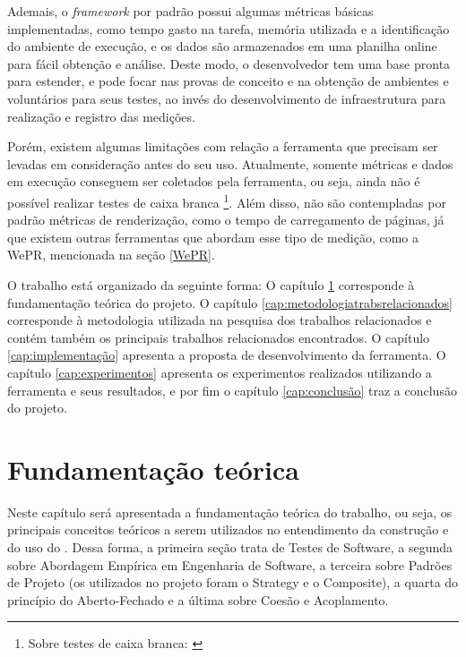 \documentclass[12pt]{tcc}
\begin{document}
	Ademais, o \emph{framework} por padrão possui algumas métricas básicas implementadas, como tempo gasto na tarefa, memória utilizada e a identificação do ambiente de execução, e os dados são armazenados em uma planilha online para fácil obtenção e análise. Deste modo, o desenvolvedor tem uma base pronta para estender, e pode focar nas provas de conceito e na obtenção de ambientes e voluntários para seus testes, ao invés do desenvolvimento de infraestrutura para realização e registro das medições.

	Porém, existem algumas limitações com relação a ferramenta que precisam ser levadas em consideração antes do seu uso. Atualmente, somente métricas e dados em execução conseguem ser coletados pela ferramenta, ou seja, ainda não é possível realizar testes de caixa branca \footnote{Sobre testes de caixa branca: \citep[Capítulo 21]{Sommerville2015Software}}. Além disso, não são contempladas por padrão métricas de renderização, como o tempo de carregamento de páginas, já que existem outras ferramentas que abordam esse tipo de medição, como a WePR, mencionada na seção \ref{WePR}.

	O trabalho está organizado da seguinte forma: O capítulo \ref{cap:fundamentacao_teorica} corresponde à fundamentação teórica do projeto. O capítulo \ref{cap:metodologiatrabsrelacionados} corresponde à metodologia utilizada na pesquisa dos trabalhos relacionados e contém também os principais trabalhos relacionados encontrados. O capítulo \ref{cap:implementação} apresenta a proposta de desenvolvimento da ferramenta. O capítulo \ref{cap:experimentos} apresenta os experimentos realizados utilizando a ferramenta e seus resultados, e por fim o capítulo \ref{cap:conclusão} traz a conclusão do projeto.


\chapter{Fundamentação teórica}
	\label{cap:fundamentacao_teorica}

		Neste capítulo será apresentada a fundamentação teórica do trabalho, ou seja, os principais conceitos teóricos a serem utilizados no entendimento da construção e do uso do . Dessa forma, a primeira seção trata de Testes de Software, a segunda sobre Abordagem Empírica em Engenharia de Software, a terceira sobre Padrões de Projeto (os utilizados no projeto foram o Strategy e o Composite), a quarta do princípio do Aberto-Fechado e a última sobre Coesão e Acoplamento.
\end{document}
